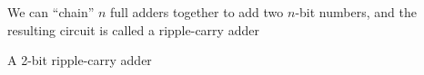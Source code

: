\documentclass[8pt,a4paper,compress]{beamer}
\begin{document}
\begin{frame}[fragile]
\pause

We can ``chain'' $n$ full adders together to add two $n$-bit numbers, and the resulting circuit is called a ripple-carry adder

\pause
\bigskip

A 2-bit ripple-carry adder
\begin{center}
\end{center}
\end{frame}
\end{document}
